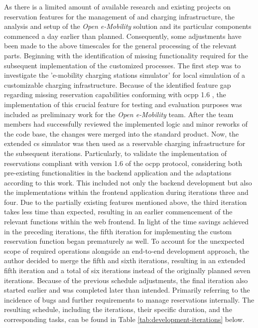As there is a limited amount of available research and existing projects on reservation features for the management of  and charging infrastructure, the analysis and setup of the \textit{Open e-Mobility} \cite{noauthor_github_nodate,noauthor_github_nodate-1,noauthor_github_nodate-2,noauthor_github_nodate-3} solution and its particular components commenced a day earlier than planned.
Consequently, some adjustments have been made to the above timescales for the general processing of the relevant parts.
Beginning with the identification of missing functionality required for the subsequent implementation of the customized processes.
The first step was to investigate the 'e-mobility charging stations simulator' \cite{noauthor_github_nodate-3} for local simulation of a customizable charging infrastructure.
Because of the identified feature gap regarding missing reservation capabilities conforming with \acrshort{ocpp} 1.6 \cite{noauthor_ocpp_nodate}, the implementation of this crucial feature for testing and evaluation purposes was included as preliminary work for the \textit{Open e-Mobility} team.
After the team members had successfully reviewed the implemented logic and minor reworks of the code base, the changes were merged into the standard product.
Now, the extended \acrshort{cs} simulator was then used as a reservable charging infrastructure for the subsequent iterations.
Particularly, to validate the implementation of reservations compliant with version 1.6 of the \acrshort{ocpp} protocol, considering both pre-existing functionalities in the backend application and the adaptations according to this work.
This included not only the backend development but also the implementations within the frontend application during iterations three and four.
Due to the partially existing features mentioned above, the third iteration takes less time than expected, resulting in an earlier commencement of the relevant functions within the web frontend.
In light of the time savings achieved in the preceding iterations, the fifth iteration for implementing the custom reservation function began prematurely as well. 
To account for the unexpected scope of required operations alongside an end-to-end development approach, the author decided to merge the fifth and sixth iterations, resulting in an extended fifth iteration and a total of six iterations instead of the originally planned seven iterations.
Because of the previous schedule adjustments, the final iteration also started earlier and was completed later than intended. 
Primarily referring to the incidence of bugs and further requirements to manage reservations internally.
The resulting schedule, including the iterations, their specific duration, and the corresponding tasks, can be found in Table \ref{tab:development-iterations} below.

